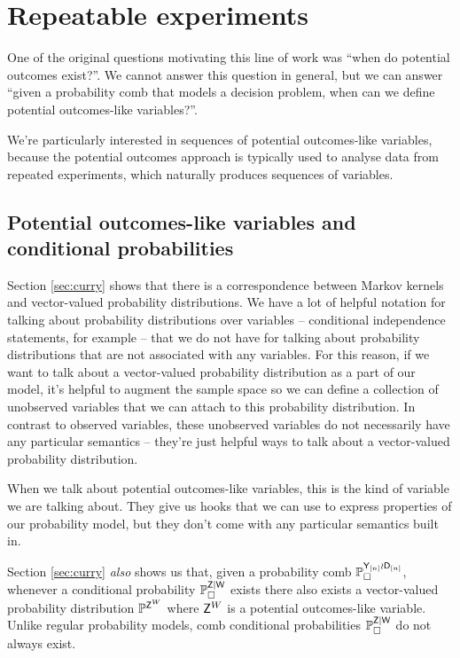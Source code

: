 
\section{Repeatable experiments}

One of the original questions motivating this line of work was ``when do potential outcomes exist?''. We cannot answer this question in general, but we can answer ``given a probability comb that models a decision problem, when can we define potential outcomes-like variables?''.

We're particularly interested in sequences of potential outcomes-like variables, because the potential outcomes approach is typically used to analyse data from repeated experiments, which naturally produces sequences of variables. 

\subsection{Potential outcomes-like variables and conditional probabilities}
Section \ref{sec:curry} shows that there is a correspondence between Markov kernels and vector-valued probability distributions. We have a lot of helpful notation for talking about probability distributions over variables -- conditional independence statements, for example -- that we do not have for talking about probability distributions that are not associated with any variables. For this reason, if we want to talk about a vector-valued probability distribution as a part of our model, it's helpful to augment the sample space so we can define a collection of unobserved variables that we can attach to this probability distribution. In contrast to observed variables, these unobserved variables do not necessarily have any particular semantics -- they're just helpful ways to talk about a vector-valued probability distribution.

When we talk about potential outcomes-like variables, this is the kind of variable we are talking about. They give us hooks that we can use to express properties of our probability model, but they don't come with any particular semantics built in.

Section \ref{sec:curry} \emph{also} shows us that, given a probability comb $\mathbb{P}_\square^{\mathsf{Y}_{[n]}\wr \mathsf{D}_{[n]}}$, whenever a conditional probability $\mathbb{P}_\square^{\mathsf{Z}|\mathsf{W}}$ exists there also exists a vector-valued probability distribution $\mathbb{P}^{\mathsf{Z}^W}$ where $\mathsf{Z}^W$ is a potential outcomes-like variable. Unlike regular probability models, comb conditional probabilities $\mathbb{P}_\square^{\mathsf{Z}|\mathsf{W}}$ do not always exist.

